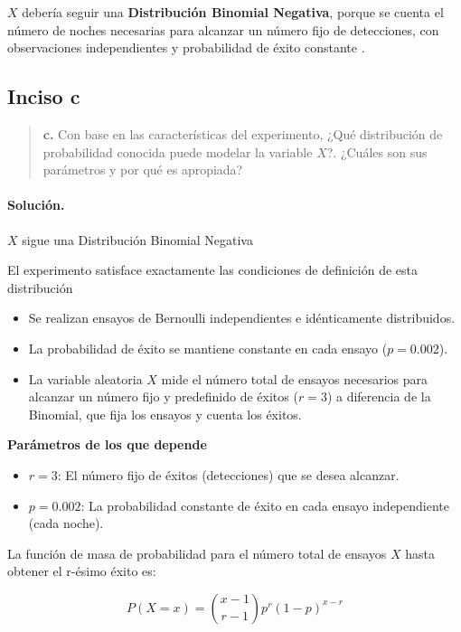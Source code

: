 \documentclass[11pt,a4paper]{article}
\begin{document}
$X$ debería seguir una \textbf{Distribución Binomial Negativa}, porque se cuenta el número de noches necesarias para alcanzar un número fijo de detecciones, con observaciones independientes y probabilidad de éxito constante \citep[sec.~3.5, pp.~118--119]{devore2008}.

\subsection*{Inciso c}

\begin{quote}
\textbf{c.} Con base en las características del experimento, ¿Qué distribución de probabilidad conocida puede modelar la variable $X$?. ¿Cuáles son sus parámetros y por qué es apropiada?
\end{quote}

\paragraph{Solución.}
$X$ sigue una Distribución Binomial Negativa

El experimento satisface exactamente las condiciones de definición de esta distribución

\begin{itemize}
    \item Se realizan ensayos de Bernoulli independientes e idénticamente distribuidos.
    \item La probabilidad de éxito se mantiene constante en cada ensayo ($p=0.002$).
    \item La variable aleatoria $X$ mide el número total de ensayos necesarios para alcanzar un número fijo y predefinido de éxitos ($r=3$) a diferencia de la Binomial, que fija los ensayos y cuenta los éxitos.
\end{itemize}

\textbf{Parámetros de los que depende}

\begin{itemize}
    \item $r=3$: El número fijo de éxitos (detecciones) que se desea alcanzar.
    \item $p=0.002$: La probabilidad constante de éxito en cada ensayo independiente (cada noche).
\end{itemize}

La función de masa de probabilidad para el número total de ensayos $X$ hasta obtener el r-ésimo éxito es:

\[
P(X=x) = \binom{x-1}{r-1}p^r(1-p)^{x-r}
\]
\end{document}
